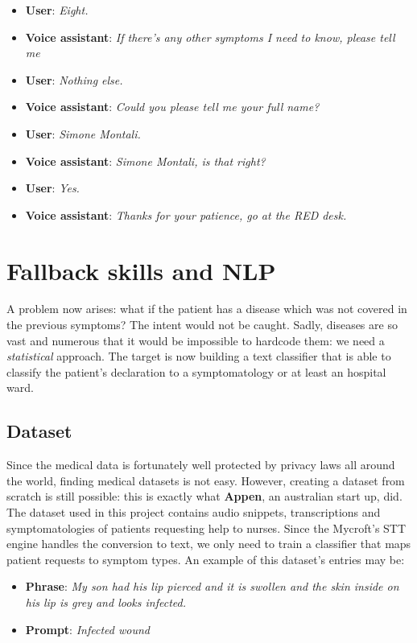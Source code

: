 \documentclass[conference]{IEEEtran}
\begin{document}
\begin{itemize}
    \item \textbf{User}: \textit{Eight.}
    \item \textbf{Voice assistant}: \textit{If there's any other symptoms I need to know, please tell me}
    \item \textbf{User}: \textit{Nothing else.}
    \item \textbf{Voice assistant}: \textit{Could you please tell me your full name?}
    \item \textbf{User}: \textit{Simone Montali.}
    \item \textbf{Voice assistant}: \textit{Simone Montali, is that right?}
    \item \textbf{User}: \textit{Yes.}
    \item \textbf{Voice assistant}: \textit{Thanks for your patience, go at the RED desk.}
\end{itemize}
\section{Fallback skills and NLP}
\label{sec:fallback}
A problem now arises: what if the patient has a disease which was not covered in the previous symptoms? The intent would not be caught. Sadly, diseases are so vast and numerous that it would be impossible to hardcode them: we need a \textit{statistical} approach. The target is now building a text classifier that is able to classify the patient's declaration to a symptomatology or at least an hospital ward.
\subsection{Dataset}
Since the medical data is fortunately well protected by privacy laws all around the world, finding medical datasets is not easy. However, creating a dataset from scratch is still possible: this is exactly what \textbf{Appen}, an australian start up, did. The dataset used in this project \cite{dataset} contains audio snippets, transcriptions and symptomatologies of patients requesting help to nurses. Since the Mycroft's STT engine handles the conversion to text, we only need to train a classifier that maps patient requests to symptom types. An example of this dataset's entries may be:
\begin{itemize}
    \item \textbf{Phrase}: \textit{My son had his lip pierced and it is swollen and the skin inside
              on his lip is grey and looks infected.}
    \item \textbf{Prompt}: \textit{Infected wound}
\end{itemize}
\end{document}
